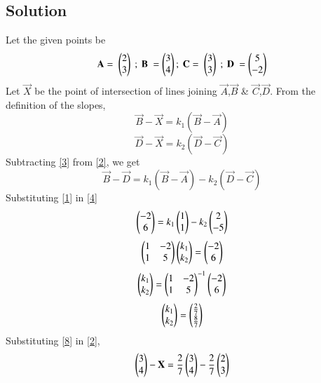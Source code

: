 \documentclass[journal,12pt,twocolumn]{IEEEtran}
\begin{document}
\subsection{Solution}
Let the given points be
\begin{equation}
\vec{A} = \ \myvec{2 \\3} \ ; \ \vec{B} \ = \myvec{3\\ 4}; \ 
\vec{C} = \ \myvec{3 \\3} \ ; \ \vec{D} \ = \myvec{5\\ -2} \label{1}
\end{equation}
Let $\vec{X}$ be the point of intersection of lines joining $\vec{A}$,$\vec{B}$ \& $\vec{C}$,$\vec{D}$. From the definition of the slopes,
\begin{equation}
\vec{B} - \vec{X} = k_{1}(\vec{B}-\vec{A}) \label{2} 
\end{equation}
\begin{equation}
    \vec{D} - \vec{X} = k_2(\vec{D} - \vec{C}) \label{3}
\end{equation}
Subtracting \eqref{3} from \eqref{2}, we get
\begin{equation}
\vec{B} - \vec{D} = k_1(\vec{B} - \vec{A})-k_2(\vec{D} - \vec{C}) \label{4}    
\end{equation}
Substituting \eqref{1} in \eqref{4}
\begin{equation}
 \begin{pmatrix}-2\\ 6\end{pmatrix} = k_1\begin{pmatrix}1 \\ 1\end{pmatrix}- k_2\begin{pmatrix}2\\ -5\end{pmatrix} \label{5}
\end{equation}
\begin{equation}
\begin{pmatrix}1 & -2 \\ 1 & 5\end{pmatrix} \begin{pmatrix}k_1\\k_2\end{pmatrix} = \begin{pmatrix}-2\\6\end{pmatrix} \label{6}    
\end{equation}
\begin{equation}
\begin{pmatrix}k_1\\k_2\end{pmatrix} = \begin{pmatrix}1 & -2 \\ 1 & 5\end{pmatrix}^{-1}\begin{pmatrix}-2\\6\end{pmatrix}
\end{equation}
\begin{equation}
\begin{pmatrix}k_1\\k_2\end{pmatrix} = \begin{pmatrix}\frac{2}{7}\\ \frac{8}{7}\end{pmatrix} \label{8}    
\end{equation}
Substituting \eqref{8} in \eqref{2},
\begin{equation}
\begin{pmatrix}3\\4\end{pmatrix} - \mathbf{X} = \frac{2}{7}\begin{pmatrix}3\\4\end{pmatrix} -\frac{2}{7}\begin{pmatrix}2\\3\end{pmatrix} \label{9} 
\end{equation}
\end{document}
